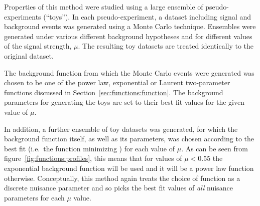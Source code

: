 Properties of this method were studied
using a large ensemble of
pseudo-experiments (``toys''). In each pseudo-experiment, a
dataset including signal and background events was generated using a Monte Carlo technique.
Ensembles were generated %
under various different background hypotheses and for different values of the signal strength, $\mu$.
The resulting toy datasets are treated identically to the original dataset.

The background function from which the Monte Carlo events were generated was chosen to be one of the power law,
exponential or Laurent two-parameter functions discussed in
Section~\ref{sec:functions:function}. The background parameters for generating the toys are set to their best fit values for the given value of $\mu$.

In addition, a further ensemble of toy datasets was generated, for which the background function itself, as well
as its parameters, was chosen according to the best fit (i.e.~the function minimizing \nll) for each value of $\mu$.
As can be seen from figure~\ref{fig:functions:profiles}, this means that for values of $\mu < 0.55$ the exponential background
function will be used and it will be a power law function otherwise.
Conceptually, this method again
treats the choice of function as a discrete nuisance parameter and so picks the
best fit values of {\em all\/} nuisance parameters for each $\mu$ value.

